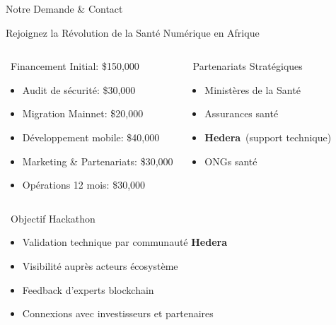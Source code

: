 \documentclass[aspectratio=169,11pt]{beamer}
\newcommand{\hedera}{\textbf{Hedera}\texttrademark}
\begin{document}
\begin{frame}{Notre Demande \& Contact}

\begin{block}{Rejoignez la Révolution de la Santé Numérique en Afrique}
\vspace{0.2cm}

\begin{columns}[T]
\begin{alertblock}{\faMoneyBillWave~Financement Initial: \$150,000}
\small
\begin{itemize}
    \item Audit de sécurité: \$30,000
    \item Migration Mainnet: \$20,000
    \item Développement mobile: \$40,000
    \item Marketing \& Partenariats: \$30,000
    \item Opérations 12 mois: \$30,000
\end{itemize}
\end{alertblock}

\begin{exampleblock}{\faHandshake~Partenariats Stratégiques}
\small
\begin{itemize}
    \item Ministères de la Santé
    \item Assurances santé
    \item \hedera~(support technique)
    \item ONGs santé
\end{itemize}
\end{exampleblock}
\end{columns}
\end{block}

\vspace{0.3cm}

\begin{block}{\faTarget~Objectif Hackathon}
\begin{itemize}
    \item Validation technique par communauté \hedera
    \item Visibilité auprès acteurs écosystème
    \item Feedback d'experts blockchain
    \item Connexions avec investisseurs et partenaires
\end{itemize}
\end{block}

\end{frame}
\end{document}

